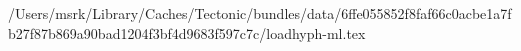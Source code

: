 /Users/msrk/Library/Caches/Tectonic/bundles/data/6ffe055852f8faf66c0acbe1a7fb27f87b869a90bad1204f3bf4d9683f597c7c/loadhyph-ml.tex